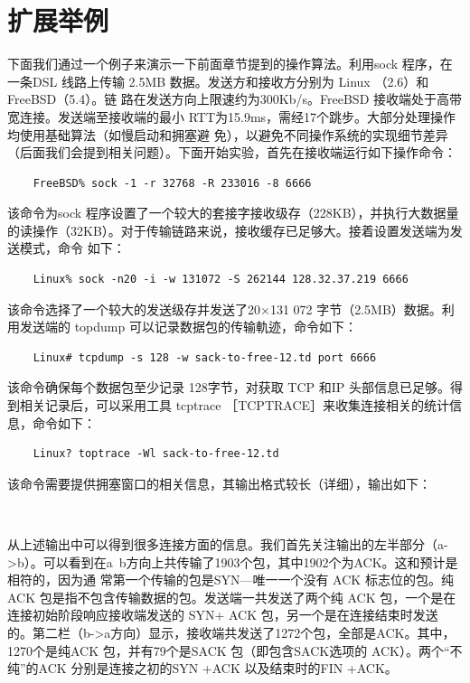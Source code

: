 \section{扩展举例}
下面我们通过一个例子来演示一下前面章节提到的操作算法。利用sock 程序，在一条DSL 线路上传输 2.5MB 数据。发送方和接收方分别为 Linux （2.6）和 FreeBSD（5.4）。链
路在发送方向上限速约为300Kb/s。FreeBSD 接收端处于高带宽连接。发送端至接收端的最小 RTT为15.9ms，需经17个跳步。大部分处理操作均使用基础算法（如慢启动和拥塞避
免），以避免不同操作系统的实现细节差异（后面我们会提到相关问题）。下面开始实验，首先在接收端运行如下操作命令：

\begin{verbatim}
    FreeBSD% sock -1 -r 32768 -R 233016 -8 6666
\end{verbatim}

该命令为sock 程序设置了一个较大的套接字接收级存（228KB），并执行大数据量的读操作（32KB）。对于传输链路来说，接收缓存已足够大。接着设置发送端为发送模式，命令
如下：

\begin{verbatim}
    Linux% sock -n20 -i -w 131072 -S 262144 128.32.37.219 6666
\end{verbatim}

该命令选择了一个较大的发送级存并发送了20×131 072 字节（2.5MB）数据。利用发送端的 topdump 可以记录数据包的传输軌迹，命令如下：
\begin{verbatim}
    Linux# tcpdump -s 128 -w sack-to-free-12.td port 6666
\end{verbatim}

该命令确保每个数据包至少记录 128字节，对获取 TCP 和IP 头部信息已足够。得到相关记录后，可以采用工具 tcptrace ［TCPTRACE］来收集连接相关的统计信息，命令如下：
\begin{verbatim}
    Linux? toptrace -Wl sack-to-free-12.td
\end{verbatim}
该命令需要提供拥塞窗口的相关信息，其输出格式较长（详细），输出如下：
\begin{verbatim}
    
\end{verbatim}

从上述输出中可以得到很多连接方面的信息。我们首先关注输出的左半部分（a->b）。可以看到在a~b方向上共传输了1903个包，其中1902个为ACK。这和预计是相符的，因为通
常第一个传输的包是SYN—唯一一个没有 ACK 标志位的包。纯ACK 包是指不包含传输数据的包。发送端一共发送了两个纯 ACK 包，一个是在连接初始阶段响应接收端发送的 SYN+
ACK 包，另一个是在连接结束时发送的。第二栏（b->a方向）显示，接收端共发送了1272个包，全部是ACK。其中，1270个是纯ACK 包，并有79个是SACK 包（即包含SACK选项的
ACK）。两个“不纯”的ACK 分别是连接之初的SYN +ACK 以及结束时的FIN +ACK。

